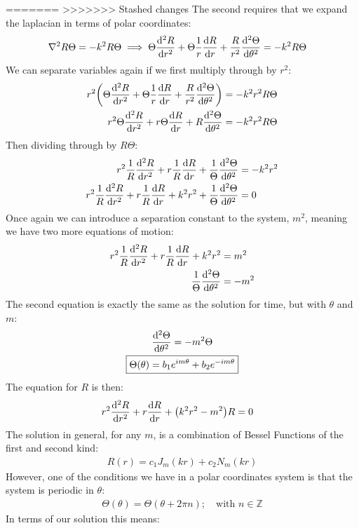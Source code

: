 \documentclass[12pt]{article}
\begin{document}
=======
>>>>>>> Stashed changes
The second requires that we expand the laplacian in terms of polar coordinates:
\begin{align*}
  \laplacian{R\Theta}&=-k^2R\Theta\implies
  \Theta\dv[2]{R}{r}+\Theta\frac1r\dv{R}{r}+
  \frac{R}{r^2}\dv[2]{\Theta}{\theta}=-k^2R\Theta
\end{align*}
We can separate variables again if we first multiply through by $r^2$:
\begin{align*}
  r^2\qty(\Theta\dv[2]{R}{r}+\Theta\frac1r\dv{R}{r}+
  \frac{R}{r^2}\dv[2]{\Theta}{\theta})&=-k^2r^2R\Theta\\
  r^2\Theta\dv[2]{R}{r}+r\Theta\dv{R}{r}+
  R\dv[2]{\Theta}{\theta}&=-k^2r^2R\Theta
\end{align*}
Then dividing through by $R\Theta$:
\begin{align*}
  r^2\frac1R\dv[2]{R}{r}+r\frac1R\dv{R}{r}+
  \frac1\Theta\dv[2]{\Theta}{\theta}&=-k^2r^2\\
  r^2\frac1R\dv[2]{R}{r}+r\frac1R\dv{R}{r}+k^2r^2
  +\frac1\Theta\dv[2]{\Theta}{\theta}&=0
\end{align*}
Once again we can introduce a separation constant to the system, $m^2$, meaning we have two more equations of motion:
\begin{align*}
  r^2\frac1R\dv[2]{R}{r}+r\frac1R\dv{R}{r}+k^2r^2&=m^2\\
  \frac1\Theta\dv[2]{\Theta}{\theta}&=-m^2
\end{align*}
The second equation is exactly the same as the solution for time, but with $\theta$ and $m$:
\begin{gather*}
  \dv[2]{\Theta}{\theta}=-m^2\Theta\\
  \boxed{\Theta(\theta)=b_1e^{im\theta}+b_2e^{-im\theta}}
\end{gather*}
The equation for $R$ is then:
\begin{align*}
  r^2\dv[2]{R}{r}+r\dv{R}{r}+\qty(k^2r^2-m^2)R&=0
\end{align*}
The solution in general, for any $m$, is a combination of Bessel Functions of the first and second kind:
\begin{align*}
  R(r)=c_1J_m(kr)+c_2N_m(kr)
\end{align*}
However, one of the conditions we have in a polar coordinates system is that the system is periodic in $\theta$:
\begin{align*}
  \Theta(\theta)=\Theta(\theta+2\pi n);\quad \text{with } n\in\mathbb{Z}
\end{align*}
In terms of our solution this means:
\end{document}
